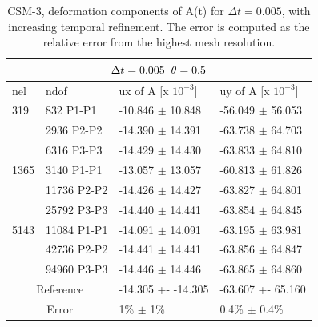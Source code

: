 \begin{table}[h!]
\centering
\begin{tabular}{ |p{1cm}||p{2.7cm}|p{3.3cm}|p{3.3cm}|}
\hline
  \multicolumn{4}{|c|}{$\Delta t = 0.005 \hspace{2mm} \theta = 0.5$} \\
\hline
nel & ndof & ux of A [x $10^{-3}$]  &uy of A [x $10^{-3}$] \\
\hline
    319     & 832 P1-P1 & -10.846     $\pm$ 10.848 & -56.049    $\pm$   56.053 \\
     & 2936 P2-P2  & -14.390     $\pm$  14.391 & -63.738       $\pm$  64.703 \\
      & 6316 P3-P3 & -14.429     $\pm$  14.430 & -63.833       $\pm$   64.810 \\
 \hline 
    1365    & 3140 P1-P1 & -13.057     $\pm$   13.057 & -60.813       $\pm$  61.826 \\
     & 11736 P2-P2& -14.426     $\pm$   14.427 & -63.827       $\pm$   64.801 \\
     & 25792 P3-P3 & -14.440     $\pm$ 14.441 & -63.854      $\pm$  64.845 \\
 \hline
      5143    & 11084 P1-P1 & -14.091      $\pm$  14.091 & -63.195    $\pm$  63.981 \\
     & 42736 P2-P2 & -14.441      $\pm$   14.441 & -63.856    $\pm$  64.847 \\
     & 94960 P3-P3 & -14.446     $\pm$ 14.446 & -63.865      $\pm$   64.860 \\
 \hline
  \multicolumn{2}{|c|}{Reference}  &-14.305 +- -14.305        & -63.607 +- 65.160    \\
   \hline
    \multicolumn{2}{|c|}{Error}  & 1\% $\pm$ 1\% &  0.4\% $\pm$ 0.4\%  \\
   \hline
\end{tabular}
\caption{CSM-3, deformation components of A(t) for $\Delta t = 0.005$, with increasing temporal refinement. The error is computed as the relative error from the highest mesh resolution.}
\label{table:csm32}
\end{table}
\newpage

